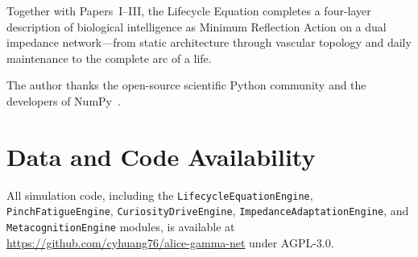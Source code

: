 ﻿\documentclass[aps,pre,twocolumn,superscriptaddress,floatfix]{revtex4-2}
\begin{document}
Together with Papers~I--III, the Lifecycle Equation
completes a four-layer description of biological
intelligence as Minimum Reflection Action on a
dual impedance network---from static architecture through
vascular topology and daily maintenance to the
complete arc of a life.


\begin{acknowledgments}
The author thanks the open-source scientific Python community
and the developers of NumPy~\cite{Harris2020}.
\end{acknowledgments}


\section*{Data and Code Availability}

All simulation code, including the
\texttt{LifecycleEquationEngine},
\texttt{PinchFatigueEngine},
\texttt{CuriosityDriveEngine},
\texttt{ImpedanceAdaptationEngine},
and \texttt{MetacognitionEngine}
modules, is available at
\url{https://github.com/cyhuang76/alice-gamma-net}
under AGPL-3.0.
\end{document}
